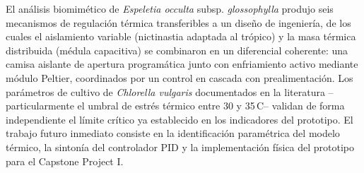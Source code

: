 \documentclass[conference]{IEEEtran}
\begin{document}
El an\'alisis biomim\'etico de \textit{Espeletia occulta} subsp.
\textit{glossophylla} produjo seis mecanismos de regulaci\'on t\'ermica
transferibles a un dise\~no de ingenier\'ia, de los cuales el aislamiento
variable (nictinastia adaptada al tr\'opico) y la masa t\'ermica distribuida (m\'edula
capacitiva) se combinaron en un diferencial coherente: una camisa
aislante de apertura program\'atica junto con enfriamiento activo mediante
m\'odulo Peltier, coordinados por un control en cascada con
prealimentaci\'on. Los par\'ametros de cultivo de \textit{Chlorella
vulgaris} documentados en la literatura --particularmente el umbral de
estr\'es t\'ermico entre 30 y 35\,\textdegree C-- validan de forma
independiente el l\'imite cr\'itico ya establecido en los indicadores del
prototipo. El trabajo futuro inmediato consiste en la identificaci\'on
param\'etrica del modelo t\'ermico, la sinton\'ia del controlador PID y la
implementaci\'on f\'isica del prototipo para el Capstone Project I.
\end{document}
